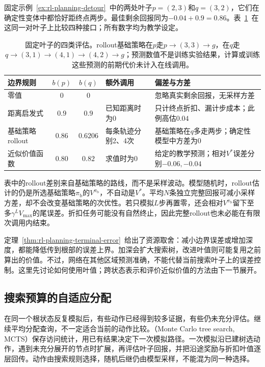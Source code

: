 固定示例~\ref{ex:rl-planning-detour}~中的两处叶子$p=(2,3)$和$q=(3,2)$，它们在确定性变体中都恰好距终点两步。最佳剩余回报同为$-0.04+0.9=0.86$。表~\ref{tab:rl-planning-leaf-values}~在这同一对叶子上比较四种接口；所有数字均为教学设定。

\begin{table}[htbp]
 \centering
 \small
 \begin{tabularx}{\linewidth}{@{}lcc>{\raggedright\arraybackslash}X>{\raggedright\arraybackslash}X@{}}
  \toprule
  边界规则 & $b(p)$ & $b(q)$ & 额外调用 & 偏差与方差\\
  \midrule
  零值 & $0$ & $0$ & 0 & 忽略真实剩余回报，无采样方差\\
  距离启发式 & $0.9$ & $0.9$ & 已知距离时为0 & 只计终点折扣、漏计步成本；此例高估$0.04$\\
  基础策略rollout & $0.86$ & $0.6206$ & 每条轨迹分别2、4次 & 基础策略在$q$多走两步；确定性模型中方差为0\\
  近似价值函数 & $0.80$ & $0.82$ & 求值时为0 & 给定的教学预测；相对$V^*$误差分别$-0.06,-0.04$\\
  \bottomrule
 \end{tabularx}
 \caption{固定叶子的四类评估。rollout基础策略在$p$走$p\to(3,3)\to g$，在$q$走$q\to(3,1)\to(4,1)\to(4,2)\to g$；预测数值不是训练实验结果，计算或训练这些预测的前期代价未计入在线调用。}
 \label{tab:rl-planning-leaf-values}
\end{table}

表中的rollout差别来自基础策略的路线，而不是采样波动。模型随机时，rollout估计的仍是所选基础策略$\pi_{\mathrm b}$的$V^{\pi_{\mathrm b}}$，不自动是$V^*$。平均$N$条独立完整回报可减小采样方差，却不会改变基础策略的次优性。若只模拟$L$步再置零，还会相对$V^{\pi_{\mathrm b}}$留下至多$\gamma^L V_{\max}$的尾误差。折扣任务可能没有自然终止，因此完整rollout也未必能在有限次调用内结束。

定理~\ref{thm:rl-planning-terminal-error}~给出了资源取舍：减小边界误差或增加深度，都能降低传到根部的误差上界。加深会扩大搜索树，改进叶值则可能复用之前算出的价值。不过，网络在其他区域预测准确，不能代替当前搜索叶子上的误差控制。这里先讨论如何使用叶值；跨状态表示和评价近似价值的方法由下一节展开。

\subsection{搜索预算的自适应分配}
\label{sec:rl-planning-mcts}

在同一个根状态反复模拟后，有些动作已经得到较多证据，有些仍未充分评估。继续平均分配查询，不一定适合当前的动作比较。（Monte Carlo tree search, MCTS）保存访问统计，用已有结果决定下一次模拟路径。一次模拟沿已建树选动作，遇到未充分展开的节点时扩展，再评估叶子回报，并把沿途奖励与折扣叶值逐层回传。动作由搜索规则选择，随机后继仍由模型采样，不能混为同一种选择。

